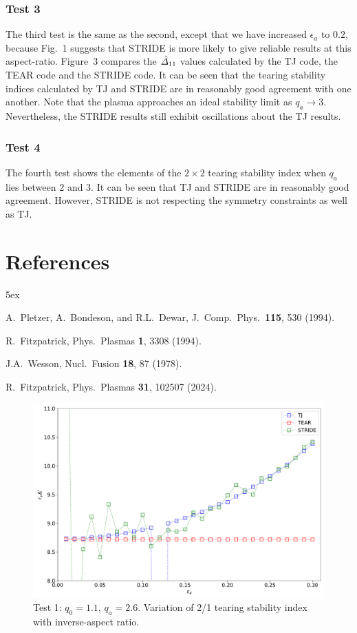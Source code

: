\documentclass[12pt,prb,aps,notitlepage]{revtex4-1}
\begin{document}
\subsubsection{Test 3}
The third test  is the same as the second, except that we have increased $\epsilon_a$ to $0.2$, because
Fig.~1 suggests that STRIDE is more likely to give reliable results at this aspect-ratio. Figure~3 compares the $\hat{\mit\Delta}_{11}$ values calculated by the TJ code, the TEAR code and
the STRIDE code. It can be seen that the tearing stability indices calculated by TJ and STRIDE are in reasonably good agreement with one another. Note that the plasma approaches
an ideal stability limit as $q_a\rightarrow 3$. Nevertheless, the STRIDE results still exhibit oscillations about the TJ results. 

\subsubsection{Test 4}
The fourth test  shows the elements of the $2\times 2$ tearing stability index when $q_a$ lies between 2 and 3.   
It can be seen that TJ and STRIDE are in reasonably good agreement. However, STRIDE is not respecting the symmetry constraints as well
as TJ. 


\section*{References}
\begin{thebibliography}{99}\baselineskip 5ex

 A.~Pletzer, A.~Bondeson, and R.L.~Dewar, J.\ Comp.\ Phys.\ {\bf 115}, 530 (1994).

 R.~Fitzpatrick, Phys.\ Plasmas {\bf 1}, 3308 (1994). 

 J.A.~Wesson, Nucl.\ Fusion {\bf 18},  87 (1978). 

 R.~Fitzpatrick, Phys.\ Plasmas {\bf 31}, 102507 (2024).

\end{thebibliography}

\newpage
\begin{figure}
\centerline{\includegraphics[width=\textwidth]{Test1.pdf}}
\caption{Test 1: $q_0=1.1$, $q_a=2.6$. Variation of 2/1 tearing stability index with inverse-aspect ratio.}
\end{figure}
\end{document}
